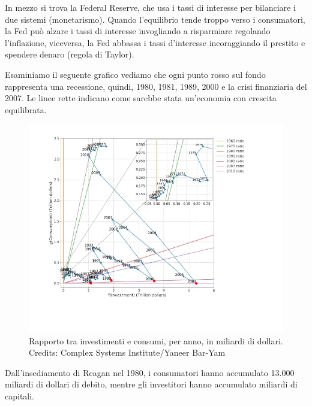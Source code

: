 \documentclass[12pt]{book} %
\begin{document}
In mezzo si trova la Federal Reserve, che usa i tassi di interesse per bilanciare i due sistemi
(monetarismo). Quando l'equilibrio tende
troppo verso i consumatori, la Fed può alzare i tassi di interesse invogliando a risparmiare regolando l'inflazione,
viceversa, la Fed abbassa i tassi d'interesse incoraggiando il prestito e spendere denaro (regola di
Taylor).

Esaminiamo il seguente grafico vediamo che ogni punto rosso sul fondo rappresenta una recessione, quindi, 1980, 1981,
1989, 2000 e la crisi finanziaria del 2007. Le linee rette indicano come sarebbe stata un'economia con crescita
equilibrata. 

\needspace{4cm}
\begin{figure}[H]
  \begin{minipage}{17cm}
    \includegraphics[width=17cm]{images/Libro-img041.png}
    \caption{Rapporto tra investimenti e consumi, per anno, in miliardi di dollari. Credits: Complex Systems Institute/Yaneer Bar-Yam}
  \end{minipage}
\end{figure} 

Dall'insediamento di Reagan nel 1980, i consumatori hanno accumulato 13.000 miliardi di dollari di debito, mentre gli
investitori hanno accumulato miliardi di
capitali.
\end{document}
